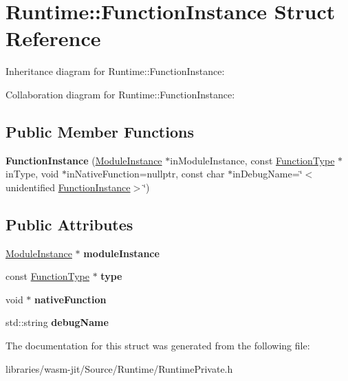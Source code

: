 \hypertarget{struct_runtime_1_1_function_instance}{}\section{Runtime\+:\+:Function\+Instance Struct Reference}
\label{struct_runtime_1_1_function_instance}


Inheritance diagram for Runtime\+:\+:Function\+Instance\+:


Collaboration diagram for Runtime\+:\+:Function\+Instance\+:
\subsection*{Public Member Functions}
\begin{DoxyCompactItemize}
\item 
\mbox{\label{struct_runtime_1_1_function_instance_a294c2e6497b68661a1bff75e31a4f93b}} 
{\bfseries Function\+Instance} (\mbox{\hyperlink{struct_runtime_1_1_module_instance}{Module\+Instance}} $\ast$in\+Module\+Instance, const \mbox{\hyperlink{struct_i_r_1_1_function_type}{Function\+Type}} $\ast$in\+Type, void $\ast$in\+Native\+Function=nullptr, const char $\ast$in\+Debug\+Name=\char`\"{}$<$unidentified \mbox{\hyperlink{struct_runtime_1_1_function_instance}{Function\+Instance}}$>$\char`\"{})
\end{DoxyCompactItemize}
\subsection*{Public Attributes}
\begin{DoxyCompactItemize}
\item 
\mbox{\label{struct_runtime_1_1_function_instance_ab0c8be78f0ec947e09133a2aa09f237f}} 
\mbox{\hyperlink{struct_runtime_1_1_module_instance}{Module\+Instance}} $\ast$ {\bfseries module\+Instance}
\item 
\mbox{\label{struct_runtime_1_1_function_instance_abccad841e6f11360846f075864246ebc}} 
const \mbox{\hyperlink{struct_i_r_1_1_function_type}{Function\+Type}} $\ast$ {\bfseries type}
\item 
\mbox{\label{struct_runtime_1_1_function_instance_a1db959a3eedd828cfe1a435fbd4c61ea}} 
void $\ast$ {\bfseries native\+Function}
\item 
\mbox{\label{struct_runtime_1_1_function_instance_afb84717eadb70a09127282e66375b833}} 
std\+::string {\bfseries debug\+Name}
\end{DoxyCompactItemize}


The documentation for this struct was generated from the following file\+:\begin{DoxyCompactItemize}
\item 
libraries/wasm-\/jit/\+Source/\+Runtime/Runtime\+Private.\+h\end{DoxyCompactItemize}
